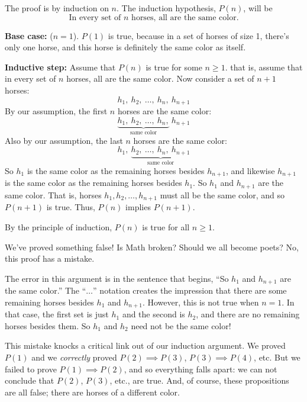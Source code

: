\begin{falseproof}

The proof is by induction on $n$.  The induction hypothesis, $P(n)$, will be
\begin{equation}\label{horsehyp}
\text{In every set of $n$ horses, all are the same color.}
\end{equation}

\textbf{Base case:} ($n=1$).  $P(1)$ is true, because in a set of horses
of size 1, there's only one horse, and this horse is definitely the same
color as itself.

\textbf{Inductive step:} Assume that $P(n)$ is true for some $n \geq 1$.
that is, assume that in every set of $n$ horses, all are the same color.
Now consider a set of $n+1$ horses:
%
\[
h_1,\ h_2,\ \dots,\ h_n,\ h_{n+1}
\]
%
By our assumption, the first $n$ horses are the same color:
%
\[
\underbrace{h_1,\ h_2,\ \dots,\ h_n,}_{\text{same color}}\ h_{n+1}
\]
%
Also by our assumption, the last $n$ horses are the same color:
%
\[
h_1,\ \underbrace{h_2,\ \dots,\ h_n,\ h_{n+1}}_{\text{same color}}
\]
%
So $h_1$ is the same color as the remaining horses besides $h_{n+1}$, and
likewise $h_{n+1}$ is the same color as the remaining horses besides
$h_1$.  So $h_1$ and $h_{n+1}$ are the same color.  That is, horses $h_1,
h_2, \dots, h_{n+1}$ must all be the same color, and so $P(n+1)$ is true.
Thus, $P(n)$ implies $P(n+1)$.

By the principle of induction, $P(n)$ is true for all $n \geq 1$.

\end{falseproof}

We've proved something false!  Is Math broken?  Should we all become
poets?  No, this proof has a mistake.


The error in this argument is in the sentence that begins, ``So $h_1$ and
$h_{n+1}$ are the same color.''  The ``$\dots$'' notation creates the
impression that there are some remaining horses besides $h_1$ and
$h_{n+1}$.  However, this is not true when $n = 1$.  In that case, the
first set is just $h_1$ and the second is $h_2$, and there are no
remaining horses besides them.  So $h_1$ and $h_2$ need not be the same
color!

This mistake knocks a critical link out of our induction argument.  We
proved $P(1)$ and we \emph{correctly} proved $P(2) \implies P(3)$, $P(3)
\implies P(4)$, etc.  But we failed to prove $P(1) \implies P(2)$, and so
everything falls apart: we can not conclude that $P(2)$, $P(3)$, etc., are
true.  And, of course, these propositions are all false; there are horses
of a different color.

